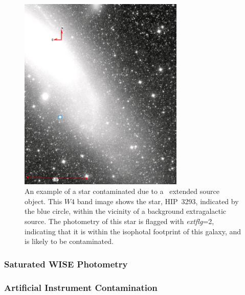         
        \begin{figure}
        \centering
        \includegraphics[width=0.7\textwidth]{Ch2/extflg_2_HIP3293}
        \caption[Contamination From \mass\ Extended Source.]{An example of a star contaminated due to a \mass\ extended source object. This $W4$ band image shows the star, HIP~3293, indicated by the blue circle, within the vicinity of a background extragalactic source. The photometry of this star is flagged with \textit{extflg}=2, indicating that it is within the isophotal footprint of this galaxy, and is likely to be contaminated.}
        \label{fig:extflg_contamination}
        \end{figure}
        
    
        \subsubsection{Saturated WISE Photometry}
    
        \subsubsection{Artificial Instrument Contamination}
        
